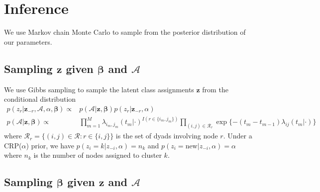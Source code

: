 \documentclass{article}
\begin{document}
\section{Inference}

We use Markov chain Monte Carlo to sample from the posterior distribution of our parameters.  

\subsection*{Sampling $\mathbf{z}$ given $\boldsymbol{\beta}$ and $\mathcal{A}$ }

We use Gibbs sampling to sample the latent class assignments $\mathbf{z}$ from the conditional distribution
\begin{align*}
p(z_r | \mathbf{z}_{-r},\mathcal{A},\alpha,\boldsymbol{\beta}) \propto&  p(\mathcal{A}|\mathbf{z},\boldsymbol{\beta}) p(z_r | \mathbf{z}_{-r},\alpha) \\
p(\mathcal{A}|\mathbf{z},\boldsymbol{\beta}) \propto &
\prod_{m=1}^M \lambda_{i_m,j_m}(t_m|\cdot)^{I(r \in \{i_m,j_m\})}  \prod_{(i,j) \in \mathcal{R}_r} \exp \{ -(t_m - t_{m-1}) \lambda_{ij}(t_m|\cdot)\} 
\end{align*} 
where $\mathcal{R}_r = \{(i,j) \in \mathcal{R}: r \in \{i,j\}\}$ is the set of dyads involving node $r$.  Under a CRP($\alpha$) prior, we have $p(z_i = k | z_{-i},\alpha) = n_k $ and $p(z_i = \mbox{new} |  z_{-i},\alpha) = \alpha$ where $n_k$ is the number of nodes assigned to cluster $k$. 

\subsection{Sampling $\boldsymbol{\beta}$ given $\mathbf{z}$ and $\mathcal{A}$ }
\end{document}
